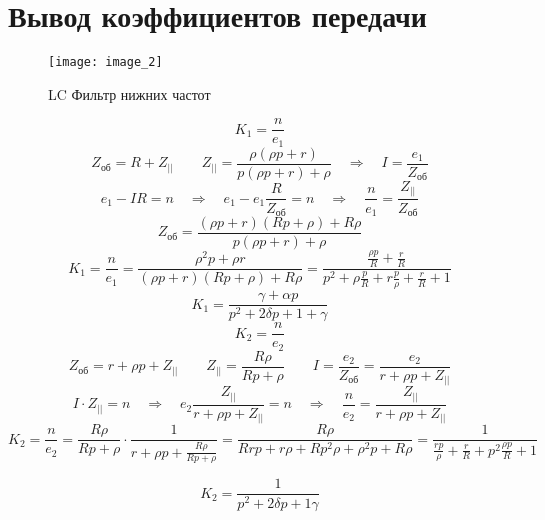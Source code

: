 \section*{Вывод коэффициентов передачи}
\begin{figure}[h!]
	\centering
	\texttt{[image: image\_2]}
	\caption{LC Фильтр нижних частот}
	\label{fig:image_2}
\end{figure}
\[
	K_1 = \frac{n}{e_1}
\]
\[
	Z_{об} = R + Z_{||} \quad \quad Z_{||} = \frac{\rho(\rho p + r)}{p(\rho p + r) + \rho} \quad \Rightarrow \quad I = \frac{e_1}{Z_{об}}
\]
\[
	e_1 - IR = n \quad \Rightarrow \quad e_1 - e_1 \frac{R}{Z_{об}} = n \quad \Rightarrow \quad \frac{n}{e_1} = \frac{Z_{||}}{Z_{об}}
\]
\[
Z_{об} = \frac{ (\rho p + r)( Rp + \rho ) + R \rho}{ p(\rho p + r) + \rho }
\]
\[
K_1 = \frac{n}{e_1} = \frac{\rho^2 p + \rho r}{(\rho p + r)(R p + \rho) + R \rho} = \frac{\frac{\rho p}{R} + \frac{r}{R}}{p^2 + \rho\frac{p}{R} + r \frac{p}{\rho} + \frac{r}{R} + 1} 
\]
\[
\boxed{K_1 = \frac{\gamma + \alpha p}{p^2 + 2 \delta p + 1 + \gamma}}
\]
\[
K_2 = \frac{n}{e_2}
\]
\[
Z_{об} = r + \rho p + Z_{||} \quad \quad Z_{||} = \frac{R \rho}{Rp + \rho} \quad \quad I = \frac{e_2}{Z_{об}} = \frac{e_2}{r + \rho p + Z_{||}}
\]
\[
I \cdot Z_{||} = n \quad \Rightarrow \quad e_2\frac{Z_{||}}{r + \rho p + Z_{||}} = n \quad \Rightarrow \quad \frac{n}{e_2} = \frac{Z_{||}}{r + \rho p + Z_{||}}
\]
\[
K_2 = \frac{n}{e_2} = \frac{R \rho}{Rp + \rho} \cdot \frac{1}{r + \rho p + \frac{R \rho}{Rp + \rho}} = \frac{R\rho}{Rrp + r \rho + R p^2 \rho + \rho^2 p + R \rho} = \frac{1}{\frac{rp}{\rho} + \frac{r}{R} + p^2 \frac{\rho p}{R} + 1}
\]

\[
\boxed{K_2 = \frac{1}{p^2 + 2\delta p + 1 \gamma}}
\]
